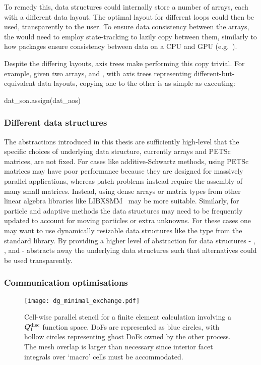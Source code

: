 \documentclass[thesis]{subfiles}
\begin{document}
To remedy this,  data structures could internally store a number of arrays, each with a different data layout.
The optimal layout for different loops could then be used, transparently to the user.
To ensure data consistency between the arrays, the  would need to employ state-tracking to lazily copy between them, similarly to how packages ensure consistency between data on a CPU and GPU (e.g.~\cite{millsPerformancePortablePETScGPUbased2020}).

Despite the differing layouts, axis trees make performing this copy trivial.
For example, given two arrays,  and , with axis trees representing different-but-equivalent data layouts, copying one to the other is as simple as executing:
\begin{pyinline}
  dat_soa.assign(dat_aos)
\end{pyinline}

\subsubsection{Different data structures}

The abstractions introduced in this thesis are sufficiently high-level that the specific choices of underlying data structure, currently \numpy{} arrays and PETSc matrices, are not fixed.
For cases like additive-Schwartz methods, using PETSc matrices may have poor performance because they are designed for massively parallel applications, whereas patch problems instead require the assembly of many small matrices.
Instead, using dense arrays or matrix types from other linear algebra libraries like LIBXSMM~\cite{heineckeLIBXSMMAcceleratingSmall2016} may be more suitable.
Similarly, for particle and adaptive methods the data structures may need to be frequently updated to account for moving particles or extra unknowns.
For these cases one may want to use dynamically resizable data structures like the  type from the \cplusplus{} standard library.
By providing a higher level of abstraction for data structures - , , and  -  abstracts away the underlying data structures such that alternatives could be used transparently.

\subsubsection{Communication optimisations}

\begin{figure}
  \centering
  \texttt{[image: dg\_minimal\_exchange.pdf]}
  \caption{
    Cell-wise parallel stencil for a finite element calculation involving a $Q_1^{\textnormal{disc}}$ function space.
    DoFs are represented as blue circles, with hollow circles representing ghost DoFs owned by the other process.
    The mesh overlap is larger than necessary since interior facet integrals over `macro' cells must be accommodated.
  }
  \label{fig:dg_minimal_exchange}
\end{figure}
\end{document}
